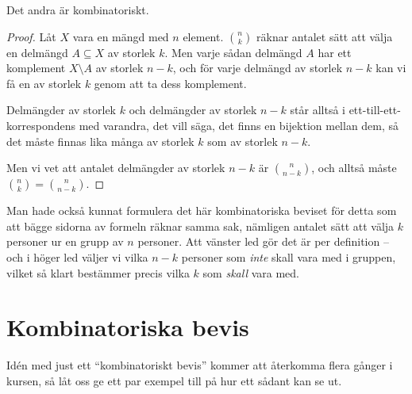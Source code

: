 \documentclass{tufte-handout}
\begin{document}
Det andra är kombinatoriskt.

\begin{proof}
	Låt $X$ vara en mängd med $n$ element. $\binom{n}{k}$ räknar antalet sätt att välja en delmängd $A \subseteq X$ av storlek $k$. Men varje sådan delmängd $A$ har ett komplement $X\setminus A$ av storlek $n-k$, och för varje delmängd av storlek $n-k$ kan vi få en av storlek $k$ genom att ta dess komplement.

	Delmängder av storlek $k$ och delmängder av storlek $n-k$ står alltså i ett-till-ett-korrespondens med varandra, det vill säga, det finns en bijektion mellan dem, så det måste finnas lika många av storlek $k$ som av storlek $n-k$.

	Men vi vet att antalet delmängder av storlek $n-k$ är $\binom{n}{n-k}$, och alltså måste $\binom{n}{k} = \binom{n}{n-k}$.
\end{proof}

Man hade också kunnat formulera det här kombinatoriska beviset för detta som att bägge sidorna av formeln räknar samma sak, nämligen antalet sätt att välja $k$ personer ur en grupp av $n$ personer. Att vänster led gör det är per definition -- och i höger led väljer vi vilka $n - k$ personer som \emph{inte} skall vara med i gruppen, vilket så klart bestämmer precis vilka $k$ som \emph{skall} vara med.

\section{Kombinatoriska bevis}

Idén med just ett ``kombinatoriskt bevis'' kommer att återkomma flera gånger i kursen, så låt oss ge ett par exempel till på hur ett sådant kan se ut.
\end{document}
